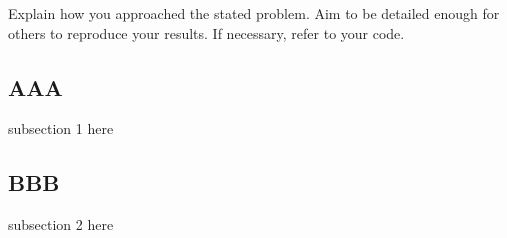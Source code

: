 Explain how you approached the stated problem. Aim to be detailed
enough for others to reproduce your results. If necessary, refer to your code.

\subsection{AAA}

subsection 1 here

\subsection{BBB}

subsection 2 here
